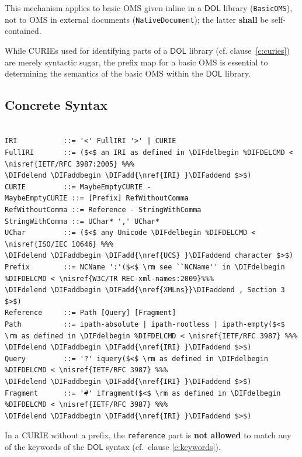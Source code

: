 \documentclass[10pt,fleqn,final]{scrreprt}
\makeatletter
\newcommand*{\cf}{cf.\@\xspace}
\newcommand*{\syntax}[1]{\texttt{#1}}
\newcommand*{\notallowed}{\textbf{not allowed}\xspace}
\newcommand*{\shall}{\textbf{shall}\xspace}
\newcommand*{\DOL}{\ensuremath{\mathsf{DOL}}\xspace}
\newcommand{\clauserefname}{clause}
\newcommand{\noterefname}{note}
\newcommand{\cref}[1]{\clauserefname~\ref{#1}}
\newcommand{\nref}[1]{\noterefname~\ref{#1}}
\newcommand{\ssclause}[1]{\subsection{#1}}
\renewcommand{\nref}[1]{\ref{nref-#1}} %
\newenvironment{definitions}[0]{\medskip }{}
\providecommand{\DIFadd}[1]{{\protect\color{blue}\uwave{#1}}} %
\providecommand{\DIFaddbegin}{} %
\providecommand{\DIFaddend}{} %
\providecommand{\DIFdelbegin}{} %
\providecommand{\DIFdelend}{} %
\makeatother
\begin{document}
\begin{definitions}
This mechanism applies to basic OMS given inline in a \DOL library (\syntax{BasicOMS}), not to OMS in external documents (\syntax{NativeDocument}); the latter \shall be self-contained.

While CURIEs used for identifying parts of a \DOL library (\cf \cref{c:curies}) are merely syntactic 
sugar, the prefix map for a basic OMS is essential to determining the semantics of the basic OMS 
within the \DOL library. 




\ssclause{Concrete Syntax}\DIFaddbegin \label{c:curie-syntax}
\DIFaddend 

\vspace{-1.4em}
\begin{lstlisting}[language=ebnf,escapeinside={()}]

IRI           ::= '<' FullIRI '>' | CURIE
FullIRI       ::= ($<$ an IRI as defined in \DIFdelbegin %DIFDELCMD < \nisref{IETF/RFC 3987:2005} %%%
\DIFdelend \DIFaddbegin \DIFadd{\nref{IRI} }\DIFaddend $>$) 
CURIE         ::= MaybeEmptyCURIE -
MaybeEmptyCURIE ::= [Prefix] RefWithoutComma
RefWithoutComma ::= Reference - StringWithComma
StringWithComma ::= UChar* ',' UChar*
UChar         ::= ($<$ any Unicode \DIFdelbegin %DIFDELCMD < \nisref{ISO/IEC 10646} %%%
\DIFdelend \DIFaddbegin \DIFadd{\nref{UCS} }\DIFaddend character $>$) 
Prefix        ::= NCName ':'($<$ \rm see ``NCName'' in \DIFdelbegin %DIFDELCMD < \nisref{W3C/TR REC-xml-names:2009}%%%
\DIFdelend \DIFaddbegin \DIFadd{\nref{XMLns}}\DIFaddend , Section 3 $>$)
Reference     ::= Path [Query] [Fragment]
Path          ::= ipath-absolute | ipath-rootless | ipath-empty($<$ \rm as defined in \DIFdelbegin %DIFDELCMD < \nisref{IETF/RFC 3987} %%%
\DIFdelend \DIFaddbegin \DIFadd{\nref{IRI} }\DIFaddend $>$)
Query         ::= '?' iquery($<$ \rm as defined in \DIFdelbegin %DIFDELCMD < \nisref{IETF/RFC 3987} %%%
\DIFdelend \DIFaddbegin \DIFadd{\nref{IRI} }\DIFaddend $>$)
Fragment      ::= '#' ifragment($<$ \rm as defined in \DIFdelbegin %DIFDELCMD < \nisref{IETF/RFC 3987} %%%
\DIFdelend \DIFaddbegin \DIFadd{\nref{IRI} }\DIFaddend $>$)
\end{lstlisting}


In a CURIE without a prefix, the \syntax{reference} part is \notallowed to match any of the keywords of the \DOL syntax (cf.\ clause \ref{c:keywords}).

\medspace






\end{definitions}
\end{document}
